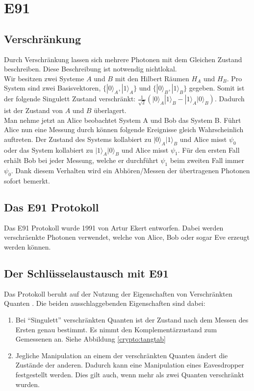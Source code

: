 \section{E91}
  \subsection{Verschr\"ankung}
  Durch Verschr\"ankung lassen sich mehrere Photonen mit dem Gleichen Zustand beschreiben. Diese Beschreibung ist notwendig nichtlokal.\\
  	Wir besitzen zwei Systeme $A$ und $B$ mit den Hilbert R\"aumen $H_A$ und $H_B$. Pro System sind zwei Basisvektoren,  $ \{|0\rangle_A,|1\rangle_A\}$ und $\{|0\rangle_B,|1\rangle_B\}$ gegeben. Somit ist der folgende Singulett Zustand verschr\"ankt: $\frac{1}{\sqrt{2}}(\lvert0\rangle_A|1\rangle_B - |1\rangle_A|0\rangle_B) $. Dadurch ist der Zustand von $A$ und $B$ \"uberlagert.\\
	Man nehme jetzt an Alice beobachtet System A und Bob das System B. F\"uhrt Alice nun eine Messung durch k\"onnen folgende Ereignisse gleich Wahrscheinlich auftreten. Der Zustand des Systems kollabiert zu $\lvert0\rangle_A|1\rangle_B$ und Alice misst $\psi_0$ oder das System kollabiert zu $\lvert1\rangle_A|0\rangle_B$ und Alice misst $\psi_1$. F\"ur den ersten Fall erh\"alt Bob bei jeder Messung, welche er durchf\"uhrt $\psi_1$ beim zweiten Fall immer $\psi_0$. Dank diesem Verhalten wird ein Abh\"oren/Messen der \"ubertragenen Photonen sofort bemerkt.
  \subsection{Das E91 Protokoll}
  Das E91 Protokoll wurde 1991 von Artur Ekert entworfen.
  Dabei werden verschr\"aenkte Photonen verwendet, welche von Alice, Bob oder sogar Eve erzeugt werden k\"onnen.

  \subsection{Der Schl\"usselaustausch mit E91}
  Das Protokoll beruht auf der Nutzung der Eigenschaften von Verschr\"ankten Quanten \cite{qc:verschraenkung}.
  Die beiden ausschlaggebenden Eigenschaften sind dabei:

  \begin{enumerate}
      \item Bei ``Singulett'' verschr\"ankten Quanten ist der Zustand nach dem Messen des Ersten genau bestimmt.
        Es nimmt den Komplement\"arzustand zum Gemessenen an.
        Siehe Abbildung \ref{crypto:tangtab}
      \item Jegliche Manipulation an einem der verschr\"ankten Quanten \"andert die Zust\"ande der anderen.
        Dadurch kann eine Manipulation eines Eavesdropper festgestellt werden.
        Dies gilt auch, wenn mehr als zwei Quanten verschr\"ankt wurden.
  \end{enumerate}

